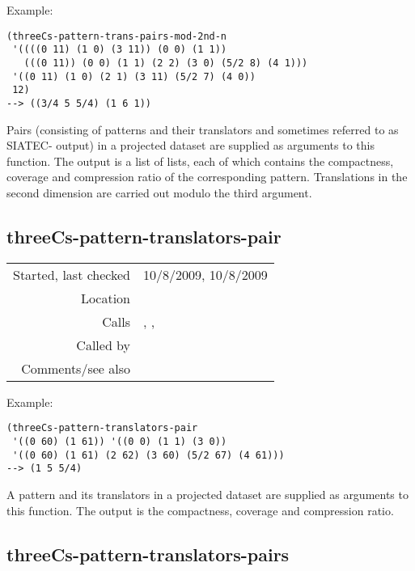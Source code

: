 \vspace{0.5cm}
\noindent Example:
\begin{verbatim}
(threeCs-pattern-trans-pairs-mod-2nd-n
 '((((0 11) (1 0) (3 11)) (0 0) (1 1))
   (((0 11)) (0 0) (1 1) (2 2) (3 0) (5/2 8) (4 1)))
 '((0 11) (1 0) (2 1) (3 11) (5/2 7) (4 0))
 12)
--> ((3/4 5 5/4) (1 6 1))
\end{verbatim}

\noindent Pairs (consisting of patterns and their
translators and sometimes referred to as SIATEC-
output) in a projected dataset are supplied as
arguments to this function. The output is a list of
lists, each of which contains the compactness,
coverage and compression ratio of the corresponding
pattern. Translations in the second dimension are
carried out modulo the third argument.


\subsection*{threeCs-pattern-translators-pair}\label{fun:threeCs-pattern-translators-pair}

\vspace{0.3cm}
\begin{tabular}{r|p{8cm}}
Started, last checked & 10/8/2009, 10/8/2009 \\
Location & \nameref{sec:evaluation-for-SIA+} \\
Calls & \nameref{fun:coverage}, \nameref{fun:index-item-1st-occurs}, \nameref{fun:my-last} \\
Called by & \nameref{fun:threeCs-pattern-translators-pairs} \\
Comments/see also &
\end{tabular}

\vspace{0.5cm}
\noindent Example:
\begin{verbatim}
(threeCs-pattern-translators-pair
 '((0 60) (1 61)) '((0 0) (1 1) (3 0))
 '((0 60) (1 61) (2 62) (3 60) (5/2 67) (4 61)))
--> (1 5 5/4)
\end{verbatim}

\noindent A pattern and its translators in a projected
dataset are supplied as arguments to this function.
The output is the compactness, coverage and
compression ratio.


\subsection*{threeCs-pattern-translators-pairs}\label{fun:threeCs-pattern-translators-pairs}

